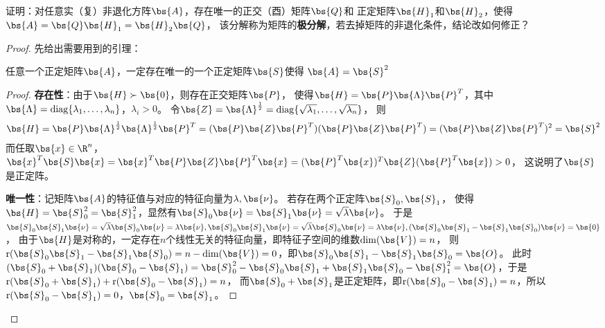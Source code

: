 \documentclass[12pt, a4paper, oneside, UTF8]{ctexbook}
\begin{document}
\begin{question}
    证明：对任意实（复）非退化方阵$\bs{A}$，存在唯一的正交（酉）矩阵$\bs{Q}$和
    正定矩阵$\bs{H}_1$和$\bs{H}_2$，使得$\bs{A}=\bs{Q}\bs{H}_1=\bs{H}_2\bs{Q}$，
    该分解称为矩阵的\textbf{极分解}，若去掉矩阵的非退化条件，结论改如何修正？
\end{question}


\begin{proof}
    先给出需要用到的引理：
    \begin{lemma} \label{正定引理}
        任意一个正定矩阵$\bs{A}$，一定存在唯一的一个正定矩阵$\bs{S}$使得
        $\bs{A}=\bs{S}^2$
    \end{lemma}
    \begin{proof}
        \textbf{存在性}：由于$\bs{H} \succ \bs{0}$，则存在正交矩阵$\bs{P}$，
        使得$\bs{H}=\bs{P}\bs{\Lambda}\bs{P}^T$，其中$\bs{\Lambda}
        =\mathrm{diag}\{\lambda_1,\ldots,\lambda_n\}$，$\lambda_i > 0$。
        令$\bs{Z}=\bs{\Lambda}^{\frac{1}{2}}=\mathrm{diag}\{\sqrt{\lambda_1},\ldots,\sqrt{\lambda_n}\}$，
        则
        \begin{align*}
            \bs{H}=\bs{P}\bs{\Lambda}^{\frac{1}{2}}\bs{\Lambda}^{\frac{1}{2}}\bs{P}^T=(\bs{P}\bs{Z}\bs{P}^T)(\bs{P}\bs{Z}\bs{P}^T)
            =(\bs{P}\bs{Z}\bs{P}^T)^2=\bs{S}^2
        \end{align*}
        而任取$\bs{x}\in \R^n$，$\bs{x}^T\bs{S}\bs{x}=
        \bs{x}^T\bs{P}\bs{Z}\bs{P}^T\bs{x}=
        (\bs{P}^T\bs{x})^T\bs{Z}(\bs{P}^T\bs{x}) >0$，
        这说明了$\bs{S}$是正定阵。

        \textbf{唯一性}：记矩阵$\bs{A}$的特征值与对应的特征向量为$\lambda,\bs{\nu}$。
        若存在两个正定阵$\bs{S}_0,\bs{S}_1$，
        使得$\bs{H}=\bs{S}_0^2=\bs{S}_1^2$，显然有$\bs{S}_0\bs{\nu}=\bs{S}_1\bs{\nu}=\sqrt{\lambda}\bs{\nu}$。
        于是$\bs{S}_0\bs{S}_1\bs{\nu}=\sqrt{\lambda}\bs{S}_0\bs{\nu}=\lambda \bs{\nu},
        \bs{S}_0\bs{S}_1\bs{\nu}=\sqrt{\lambda}\bs{S}_0\bs{\nu}=\lambda \bs{\nu},
        (\bs{S}_0\bs{S}_1-\bs{S}_1\bs{S}_0)\bs{\nu}=\bs{0}$，
        由于$\bs{H}$是对称的，一定存在$n$个线性无关的特征向量，即特征子空间的维数$\mathrm{dim}(\bs{V})=n$，
        则$\mathrm{r}(\bs{S}_0\bs{S}_1-\bs{S}_1\bs{S}_0)=n-\mathrm{dim}(\bs{V})=0$，即$\bs{S}_0\bs{S}_1-\bs{S}_1\bs{S}_0=\bs{O}$。
        此时$(\bs{S}_0+\bs{S}_1)(\bs{S}_0-\bs{S}_1)=\bs{S}_0^2-\bs{S}_0\bs{S}_1+\bs{S}_1\bs{S}_0-\bs{S}_1^2=\bs{O}$，于是$\mathrm{r}(\bs{S}_0+\bs{S}_1)+\mathrm{r}(\bs{S}_0-\bs{S}_1)=n$，
        而$\bs{S}_0+\bs{S}_1$是正定矩阵，即$\mathrm{r}(\bs{S}_0-\bs{S}_1)=n$，所以$\mathrm{r}(\bs{S}_0-\bs{S}_1)=0$，$\bs{S}_0=\bs{S}_1$。
    

\end{proof}
\end{proof}
\end{document}
